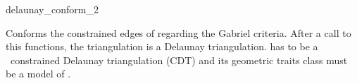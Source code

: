 \begin{ccRefFunction}{delaunay_conform_2}


{ Conforms the constrained edges of  regarding the Gabriel
  criteria. After a call to this functions, the triangulation is a
  Delaunay triangulation.
  \ccPrecond {} has to be a \cgal\ constrained Delaunay
  triangulation (CDT) and its geometric traits class must be a model
  of .}

\end{ccRefFunction}
